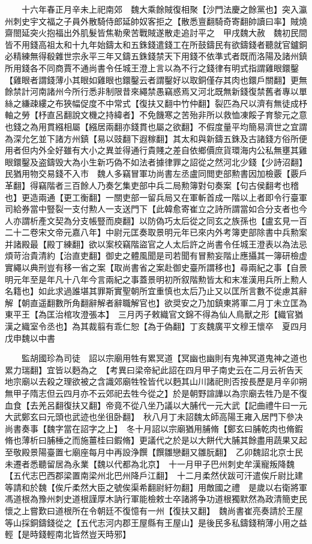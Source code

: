 　　十六年春正月辛未上祀南郊　魏大乘餘賊復相聚【沙門法慶之餘黨也】突入瀛州刺史宇文福之子員外散騎侍郎延帥奴客拒之【散悉亶翻騎奇寄翻帥讀曰率】賊燒齋閤延突火抱福出外肌髮皆焦勒衆苦戰賊遂散走追討平之　甲戌魏大赦　魏初民間皆不用錢高祖太和十九年始鑄太和五銖錢遣錢工在所鼓鑄民有欲鑄錢者聽就官鑪銅必精練無得殽雜世宗永平三年又鑄五銖錢禁天下用錢不依準式者既而洛陽及諸州鎮所用錢各不同商賈不通尚書令任城王澄上言以為不行之錢律有明式指謂雞眼鐶鑿【雞眼者謂錢薄小其眼如雞眼也鐶鑿云者謂鑿好以取銅僅存其肉也鐶戶關翻】更無餘禁計河南諸州今所行悉非制限昔來繩禁愚竊惑焉又河北既無新錢復禁舊者專以單絲之縑疎縷之布狹幅促度不中常式【復扶又翻中竹仲翻】裂匹為尺以濟有無徒成杼軸之勞【杼直呂翻說文機之持緯者】不免饑寒之苦殆非所以救恤凍餒子育黎元之意也錢之為用貫繦相屬【繦居兩翻亦錢貫也屬之欲翻】不假度量平均簡易濟世之宜謂為深允乞並下諸方州鎮【易以豉翻下遐稼翻】其太和與新鑄五銖及古諸錢方俗所便用者但内外全好雖有大小之異並得通行貴賤之差自依鄉價庶貨環海内公私無壅其雞眼鐶鑿及盗鑄毁大為小生新巧偽不如法者據律罪之詔從之然河北少錢【少詩沼翻】民猶用物交易錢不入市　魏人多竊冒軍功尚書左丞盧同閲吏部勲書因加檢覈【覈戶革翻】得竊階者三百餘人乃奏乞集吏部中兵二局勲簿對句奏案【句古侯翻考也稽也】更造兩通【更工衡翻】一關吏部一留兵局又在軍斬首成一階以上者即令行臺軍司給券當中豎裂一支付勲人一支送門下【此韓愈寄崔立之詩所謂當如合分支者也今人亦謂析產文契為分支帳豎而庾翻】以防偽巧太后從之同玄之族孫也【盧玄見一百二十二卷宋文帝元嘉八年】中尉元匡奏取景明元年已來内外考簿吏部除書中兵勲案并諸殿最【殿丁練翻】欲以案校竊階盜官之人太后許之尚書令任城王澄表以為法忌煩苛治貴清約【治直吏翻】御史之體風聞是司若聞有冒勲妄階止應攝其一簿研檢虚實繩以典刑豈有移一省之案【取尚書省之案赴御史臺所謂移也】尋兩紀之事【自景明元年至是年凡十八年今言兩紀之事蓋景明初所叙階勲皆太和末准漢用兵所上勲人名籍也】如此求過誰堪其罪斯實聖朝所宜重慎也太后乃止又以匡所言數不從慮其辭解【朝直遥翻數所角翻辭解者辭職解官也】欲奨安之乃加鎮東將軍二月丁未立匡為東平王【為匡治棺攻澄張本】　三月丙子敕織官文錦不得為仙人鳥獸之形【織官猶漢之織室令丞也】為其裁翦有乖仁恕【為于偽翻】丁亥魏廣平文穆王懷卒　夏四月戊申魏以中書

　　監胡國珍為司徒　詔以宗廟用牲有累冥道【冥幽也幽則有鬼神冥道鬼神之道也累力瑞翻】宜皆以麪為之　【考異曰梁帝紀此詔在四月甲子南史云在二月云祈告天地宗廟以去殺之理欲被之含識郊廟牲牷皆代以麪其山川諸祀則否按長歷是月辛卯朔無甲子隋志但云四月亦不云郊祀去牲今從之】於是朝野諠譁以為宗廟去牲乃是不復血食【去羌呂翻復扶又翻】帝竟不從八坐乃議以大脯代一元大武【記曲禮牛曰一元大武鄭玄曰元頭也武迹也坐徂卧翻】　秋八月丁未詔魏太師高陽王雍入居門下參决尚書奏事【魏字當在詔字之上】　冬十月詔以宗廟猶用脯脩【鄭玄曰脯乾肉也脩鍜脩也薄析曰脯棰之而施薑桂曰鍜脩】更議代之於是以大餅代大脯其餘盡用蔬果又起至敬殿景陽臺置七廟座每月中再設浄饌【饌雛戀翻又雛朊翻】　乙卯魏詔北京士民未遷者悉聽留居為永業【魏以代都為北京】　十一月甲子巴州刺史牟漢寵叛降魏【五代志巴西郡梁置南梁州北巴州降戶江翻】　十二月柔然伏跋可汗遣俟斤尉比建等請和於魏【俟斤柔然大臣之號俟渠希翻尉紆勿翻】用敵國之禮　是歲以右衛將軍馮道根為豫州刺史道根謹厚木訥行軍能檢敕士卒諸將争功道根獨默然為政清簡吏民懷之上嘗歎曰道根所在令朝廷不復憶有一州【復扶又翻】　魏尚書崔亮奏請於王屋等山採銅鑄錢從之【五代志河内郡王屋縣有王屋山】是後民多私鑄錢稍薄小用之益輕【是時錢輕南北皆然豈天時邪】

